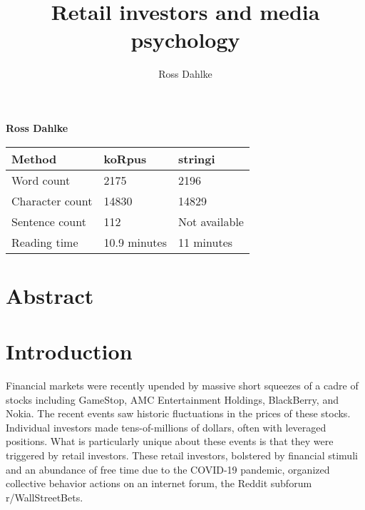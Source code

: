 \documentclass[12pt,]{article}
\title{Retail investors and media psychology  }
\author{\Large Ross Dahlke\vspace{0.05in} \newline\normalsize\emph{}  }
\date{}
\newcommand*{\authorfont}{\fontfamily{phv}\selectfont}
\begin{document}
	
%

{%
\setlength{\parindent}{0pt}
\thispagestyle{plain}
{\fontsize{18}{20}\selectfont\raggedright 
\maketitle  %

}

{
   \vskip 13.5pt\relax \normalsize\fontsize{11}{12} 
\textbf{\authorfont Ross Dahlke} \hskip 15pt \emph{\small }   

}

}






\vskip -8.5pt



\noindent \doublespacing 

\begin{longtable}[]{@{}lll@{}}
\toprule
Method & koRpus & stringi\tabularnewline
\midrule
\endhead
Word count & 2175 & 2196\tabularnewline
Character count & 14830 & 14829\tabularnewline
Sentence count & 112 & Not available\tabularnewline
Reading time & 10.9 minutes & 11 minutes\tabularnewline
\bottomrule
\end{longtable}

\hypertarget{abstract}{%
\section{Abstract}\label{abstract}}

\hypertarget{introduction}{%
\section{Introduction}\label{introduction}}

Financial markets were recently upended by massive short squeezes of a
cadre of stocks including GameStop, AMC Entertainment Holdings,
BlackBerry, and Nokia. The recent events saw historic fluctuations in
the prices of these stocks. Individual investors made tens-of-millions
of dollars, often with leveraged positions. What is particularly unique
about these events is that they were triggered by retail investors.
These retail investors, bolstered by financial stimuli and an abundance
of free time due to the COVID-19 pandemic, organized collective behavior
actions on an internet forum, the Reddit subforum r/WallStreetBets.
\end{document}
